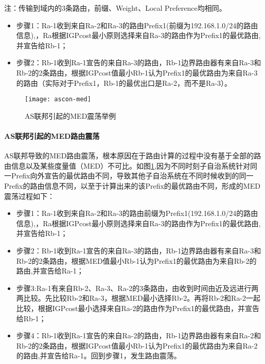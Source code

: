 注：传输到域内的3条路由，前缀、Weight、Local Preference均相同。

\begin{itemize}
\item 步骤1：Ra-1收到来自Ra-2和Ra-3的路由Prefix1(前缀为192.168.1.0/24的路由信息),，Ra根据IGPcost最小原则选择来自Ra-3的路由作为Prefix1的最优路由,并宣告给Rb-1；
\item 步骤2：Rb-1收到Ra-1宣告的来自Ra-3的路由，Rb-1边界路由器有来自Ra-3和Rb-2的2条路由，根据IGPcost值最小Rb-1认为Prefix1的最优路由为来自Ra-3的路由（实际对于Prefix1，Rb-1的最优出口是Ra-2，而不是Ra-3）。
\end{itemize}


\begin{figure}
  \centering
  \texttt{[image: ascon-med]}
  \caption{AS联邦引起的MED震荡举例\cite{rfc3345}}
  \label{fig:ascon-med}
\end{figure}

\paragraph{AS联邦引起的MED路由震荡}
AS联邦导致的MED路由震荡\cite{rfc3345}，根本原因在于路由计算的过程中没有基于全部的路由信息以及某些度量值（MED）不可比。如图\ref{fig:ascon-med},因为不同时刻子自治系统针对同一Prefix向外宣告的最优路由不同，导致其他子自治系统在不同时候收到的同一Prefix的路由信息不同，以至于计算出来的该Prefix的最优路由不同，形成的MED震荡过程如下：


\begin{itemize}
  \item 步骤1：Ra-1收到来自Ra-2和Ra-3的路由前缀为Prefix1(192.168.1.0/24的路由信息),，Ra根据IGPcost最小原则选择来自Ra-3的路由作为Prefix1的最优路由,并宣告给Rb-1；
  \item 步骤2：Rb-1收到Ra-1宣告的来自Ra-3的路由，Rb-1边界路由器有来自Ra-3和Rb-2的2条路由，根据MED值最小Rb-1认为Prefix1的最优路由为来自Rb-2的路由,并宣告给Ra-1；
  \item 步骤3:Ra-1有来自Rb-2、Ra-3、Ra-2的3条路由，由收到时间由近及远进行两两比较。先比较Rb-2和Ra-3，根据MED最小选择Rb-2。再将Rb-2和Ra-2一起比较，根据IGPcost最小选择来自Ra-2的路由作为Prefix1的最优路由，并宣告给Rb-1；
  \item 步骤4：Rb-1收到Ra-1宣告的来自Ra-2的路由，Rb-1边界路由器有来自Ra-2和Rb-2的2条路由，根据IGPcost值最小Rb-1认为Prefix1的最优路由为来自Ra-2的路由,并宣告给Ra-1。回到步骤1，发生路由震荡。
\end{itemize}

